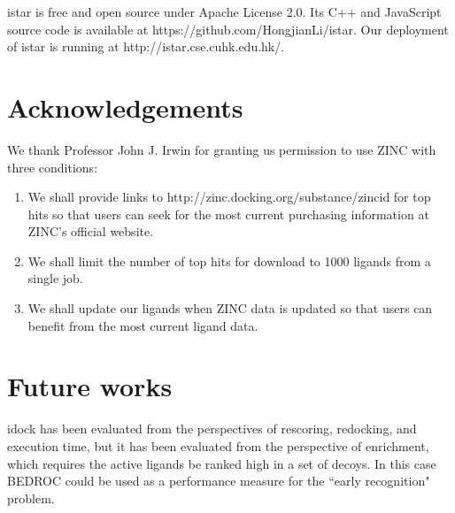 istar is free and open source under Apache License 2.0. Its C++ and JavaScript source code is available at https://github.com/HongjianLi/istar. Our deployment of istar is running at http://istar.cse.cuhk.edu.hk/.

\section{Acknowledgements}

We thank Professor John J. Irwin for granting us permission to use ZINC \citep{532,1178} with three conditions:
\begin{enumerate}
\item We shall provide links to http://zinc.docking.org/substance/zincid for top hits so that users can seek for the most current purchasing information at ZINC's official website.
\item We shall limit the number of top hits for download to 1000 ligands from a single job.
\item We shall update our ligands when ZINC data is updated so that users can benefit from the most current ligand data.
\end{enumerate}

\section{Future works}

idock has been evaluated from the perspectives of rescoring, redocking, and execution time, but it has been evaluated from the perspective of enrichment, which requires the active ligands be ranked high in a set of decoys. In this case BEDROC \citep{490} could be used as a performance measure for the ``early recognition" problem.

\chapterend
